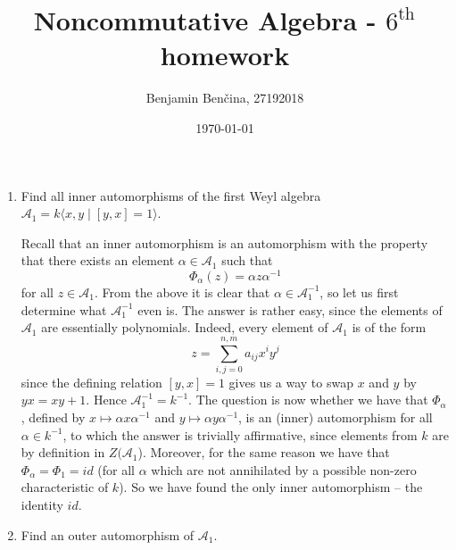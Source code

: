 \documentclass[a4paper, 12pt]{article}
\title{Noncommutative Algebra - $6^{\text{th}}$ homework}
\author{Benjamin Benčina, 27192018}
\date{\today}
\begin{document}
\maketitle

\begin{Exercise}
    \begin{enumerate}[label=(\alph*)]
        \item 
            Find all inner automorphisms of the first Weyl algebra
            $\mathcal{A}_1 = k\langle x, y \; | \; [y, x] = 1 \rangle$.

            Recall that an inner automorphism is an automorphism with the property that
            there exists an element $\alpha \in \mathcal{A}_1$ such that
            \[
                \Phi_\alpha(z) = \alpha z \alpha^{-1}
            \]
            for all $z \in \mathcal{A}_1$.
            From the above it is clear that $\alpha \in \mathcal{A}_1^{-1}$,
            so let us first determine what $\mathcal{A}_1^{-1}$ even is.
            The answer is rather easy, since the elements of $\mathcal{A}_1$ are essentially polynomials.
            Indeed, every element of $\mathcal{A}_1$ is of the form
            \[
                z = \sum_{i, j = 0}^{n, m} a_{ij} x^i y^j
            \]
            since the defining relation $[y, x] = 1$ gives us a way to swap $x$ and $y$ by $yx = xy + 1$.
            Hence $\mathcal{A}_1^{-1} = k^{-1}$.
            The question is now whether we have that $\Phi_\alpha$,
            defined by $x \mapsto \alpha x \alpha^{-1}$ and $y \mapsto \alpha y \alpha^{-1}$,
            is an (inner) automorphism for all $\alpha \in k^{-1}$,
            to which the answer is trivially affirmative, since elements from $k$ are by definition in $Z(\mathcal{A}_1$).
            Moreover, for the same reason we have that $\Phi_\alpha = \Phi_1 = id$ (for all $\alpha$ which are not annihilated by a possible non-zero characteristic of $k$).
            So we have found the only inner automorphism -- the identity $id$.
        \item
            Find an outer automorphism of $\mathcal{A}_1$.


\end{enumerate}
\end{Exercise}
\end{document}
